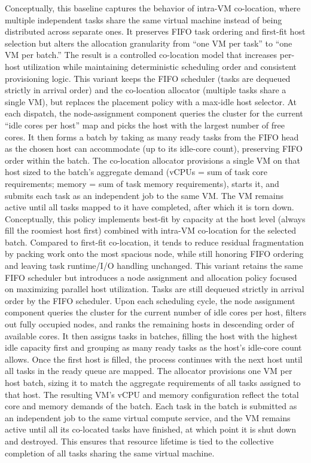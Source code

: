 Conceptually, this baseline captures the behavior of intra-VM co-location, where multiple independent tasks share the same virtual machine instead of being distributed across separate ones. It preserves FIFO task ordering and first-fit host selection but alters the allocation granularity from “one VM per task” to “one VM per batch.” The result is a controlled co-location model that increases per-host utilization while maintaining deterministic scheduling order and consistent provisioning logic.
This variant keeps the FIFO scheduler (tasks are dequeued strictly in arrival order) and the co-location allocator (multiple tasks share a single VM), but replaces the placement policy with a max-idle host selector. At each dispatch, the node-assignment component queries the cluster for the current “idle cores per host” map and picks the host with the largest number of free cores. It then forms a batch by taking as many ready tasks from the FIFO head as the chosen host can accommodate (up to its idle-core count), preserving FIFO order within the batch.
The co-location allocator provisions a single VM on that host sized to the batch’s aggregate demand (vCPUs = sum of task core requirements; memory = sum of task memory requirements), starts it, and submits each task as an independent job to the same VM. The VM remains active until all tasks mapped to it have completed, after which it is torn down. Conceptually, this policy implements best-fit by capacity at the host level (always fill the roomiest host first) combined with intra-VM co-location for the selected batch. Compared to first-fit co-location, it tends to reduce residual fragmentation by packing work onto the most spacious node, while still honoring FIFO ordering and leaving task runtime/I/O handling unchanged.
This variant retains the same FIFO scheduler but introduces a node assignment and allocation policy focused on maximizing parallel host utilization. Tasks are still dequeued strictly in arrival order by the FIFO scheduler. Upon each scheduling cycle, the node assignment component queries the cluster for the current number of idle cores per host, filters out fully occupied nodes, and ranks the remaining hosts in descending order of available cores. It then assigns tasks in batches, filling the host with the highest idle capacity first and grouping as many ready tasks as the host’s idle-core count allows. Once the first host is filled, the process continues with the next host until all tasks in the ready queue are mapped.
The allocator provisions one VM per host batch, sizing it to match the aggregate requirements of all tasks assigned to that host. The resulting VM’s vCPU and memory configuration reflect the total core and memory demands of the batch. Each task in the batch is submitted as an independent job to the same virtual compute service, and the VM remains active until all its co-located tasks have finished, at which point it is shut down and destroyed. This ensures that resource lifetime is tied to the collective completion of all tasks sharing the same virtual machine.
